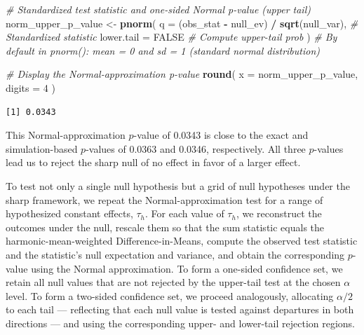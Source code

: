 \documentclass[
  12pt,
  leqno]{article}
\newenvironment{Shaded}{\begin{snugshade}}{\end{snugshade}}
\newcommand{\AttributeTok}[1]{\textcolor[rgb]{0.13,0.29,0.53}{#1}}
\newcommand{\CommentTok}[1]{\textcolor[rgb]{0.56,0.35,0.01}{\textit{#1}}}
\newcommand{\ConstantTok}[1]{\textcolor[rgb]{0.56,0.35,0.01}{#1}}
\newcommand{\DecValTok}[1]{\textcolor[rgb]{0.00,0.00,0.81}{#1}}
\newcommand{\FunctionTok}[1]{\textcolor[rgb]{0.13,0.29,0.53}{\textbf{#1}}}
\newcommand{\NormalTok}[1]{#1}
\newcommand{\OtherTok}[1]{\textcolor[rgb]{0.56,0.35,0.01}{#1}}
\newcommand{\SpecialCharTok}[1]{\textcolor[rgb]{0.81,0.36,0.00}{\textbf{#1}}}
\begin{document}
\begin{Shaded}
\begin{Highlighting}[]
\CommentTok{\# Standardized test statistic and one{-}sided Normal p{-}value (upper tail)}
\NormalTok{norm\_upper\_p\_value }\OtherTok{\textless{}{-}} \FunctionTok{pnorm}\NormalTok{(}
  \AttributeTok{q =}\NormalTok{ (obs\_stat }\SpecialCharTok{{-}}\NormalTok{ null\_ev) }\SpecialCharTok{/} \FunctionTok{sqrt}\NormalTok{(null\_var), }\CommentTok{\# Standardized statistic}
  \AttributeTok{lower.tail =} \ConstantTok{FALSE}                         \CommentTok{\# Compute upper{-}tail prob}
\NormalTok{)}
\CommentTok{\# By default in pnorm(): mean = 0 and sd = 1 (standard normal distribution)}

\CommentTok{\# Display the Normal{-}approximation p{-}value}
\FunctionTok{round}\NormalTok{(}
  \AttributeTok{x =}\NormalTok{ norm\_upper\_p\_value,}
  \AttributeTok{digits =} \DecValTok{4}
\NormalTok{)}
\end{Highlighting}
\end{Shaded}

\begin{verbatim}
[1] 0.0343
\end{verbatim}

\doublespacing

This Normal-approximation \(p\)-value of 0.0343 is close to the exact
and simulation-based \(p\)-values of 0.0363 and 0.0346, respectively.
All three \(p\)-values lead us to reject the sharp null of no effect in
favor of a larger effect.

To test not only a single null hypothesis but a grid of null hypotheses
under the sharp framework, we repeat the Normal-approximation test for a
range of hypothesized constant effects, \(\tau_h\). For each value of
\(\tau_h\), we reconstruct the outcomes under the null, rescale them so
that the sum statistic equals the harmonic-mean-weighted
Difference-in-Means, compute the observed test statistic and the
statistic's null expectation and variance, and obtain the corresponding
\(p\)-value using the Normal approximation. To form a one-sided
confidence set, we retain all null values that are not rejected by the
upper-tail test at the chosen \(\alpha\) level. To form a two-sided
confidence set, we proceed analogously, allocating \(\alpha/2\) to each
tail --- reflecting that each null value is tested against departures in
both directions --- and using the corresponding upper- and lower-tail
rejection regions.

\singlespacing
\end{document}
